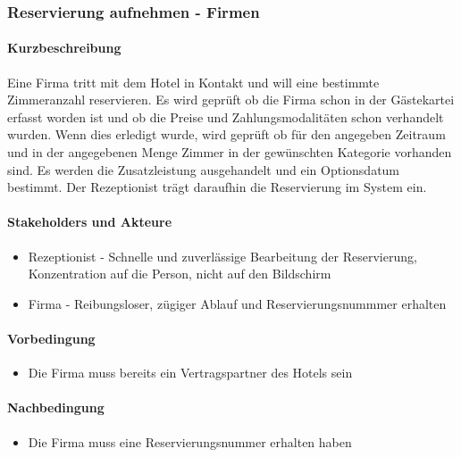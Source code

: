\subsubsection{Reservierung aufnehmen - Firmen}
\label{UseCase_ReservierungAufnehmenFirmen}

\paragraph{Kurzbeschreibung}  
Eine Firma tritt mit dem Hotel in Kontakt und will eine bestimmte \Gls{Zimmer}anzahl reservieren. Es wird geprüft ob die Firma schon in der Gästekartei erfasst worden ist und ob die Preise und Zahlungsmodalitäten schon verhandelt wurden. Wenn dies erledigt wurde, wird geprüft ob für den angegeben Zeitraum und in der angegebenen Menge \Gls{Zimmer} in der gewünschten Kategorie vorhanden sind. Es werden die \Gls{Zusatzleistung} ausgehandelt und ein \Gls{Optionsdatum} bestimmt. Der \Gls{Rezeptionist} trägt daraufhin die \Gls{Reservierung} im System ein.

\paragraph{Stakeholders und Akteure}
\begin{itemize}
	\item \Gls{Rezeptionist} - Schnelle und zuverlässige Bearbeitung der \Gls{Reservierung}, Konzentration auf die Person, nicht auf den Bildschirm
	\item Firma - Reibungsloser, zügiger Ablauf und Reservierungsnummmer erhalten
\end{itemize}

\paragraph{Vorbedingung}
\begin{itemize}
	\item Die Firma muss bereits ein Vertragspartner des Hotels sein
\end{itemize}

\paragraph{Nachbedingung}
\begin{itemize}
	\item Die Firma muss eine \Gls{Reservierungsnummer} erhalten haben
\end{itemize}

